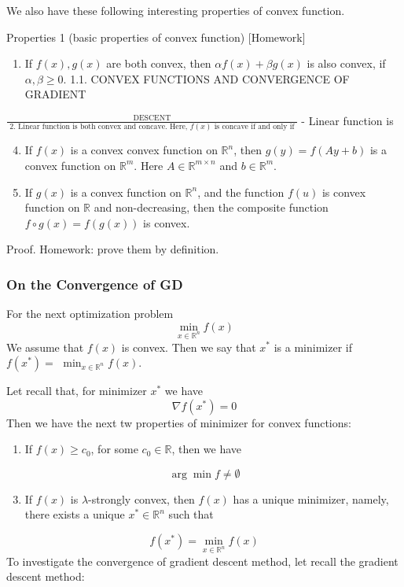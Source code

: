 \documentclass[10pt]{article}
\begin{document}
We also have these following interesting properties of convex function.

Properties 1 (basic properties of convex function) [Homework]

\begin{enumerate}
  \item If $f(x), g(x)$ are both convex, then $\alpha f(x)+\beta g(x)$ is also convex, if $\alpha, \beta \geq 0$. 1.1. CONVEX FUNCTIONS AND CONVERGENCE OF GRADIENT
\end{enumerate}
$\frac{\text { DESCENT }}{\text { 2. Linear function is both convex and concave. Here, } f(x) \text { is concave if and only if }}$ - Linear function is

\begin{enumerate}
  \setcounter{enumi}{3}
  \item If $f(x)$ is a convex convex function on $\mathbb{R}^{n}$, then $g(y)=f(A y+b)$ is a convex function on $\mathbb{R}^{m}$. Here $A \in \mathbb{R}^{m \times n}$ and $b \in \mathbb{R}^{m}$.

  \item If $g(x)$ is a convex function on $\mathbb{R}^{n}$, and the function $f(u)$ is convex function on $\mathbb{R}$ and non-decreasing, then the composite function $f \circ g(x)=f(g(x))$ is convex.

\end{enumerate}
Proof. Homework: prove them by definition.

\subsubsection{On the Convergence of GD}
For the next optimization problem
$$
\min _{x \in \mathbb{R}^{n}} f(x)
$$
We assume that $f(x)$ is convex. Then we say that $x^{*}$ is a minimizer if $f\left(x^{*}\right)=$ $\min _{x \in \mathbb{R}^{n}} f(x) .$

Let recall that, for minimizer $x^{*}$ we have
$$
\nabla f\left(x^{*}\right)=0
$$
Then we have the next tw properties of minimizer for convex functions:

\begin{enumerate}
  \item If $f(x) \geq c_{0}$, for some $c_{0} \in \mathbb{R}$, then we have
\end{enumerate}
$$
\arg \min f \neq \emptyset
$$

\begin{enumerate}
  \setcounter{enumi}{2}
  \item If $f(x)$ is $\lambda$-strongly convex, then $f(x)$ has a unique minimizer, namely, there exists a unique $x^{*} \in \mathbb{R}^{n}$ such that
\end{enumerate}
$$
f\left(x^{*}\right)=\min _{x \in \mathbb{R}^{n}} f(x)
$$
To investigate the convergence of gradient descent method, let recall the gradient descent method:
\end{document}
